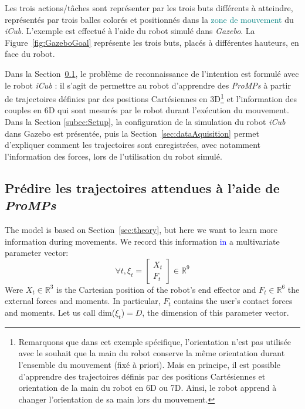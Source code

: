 \documentclass[utf8]{frontiersSCNS} %
\newcommand{\rev}[1]{\textcolor{blue}{#1}}
\newcommand{\toimprove}[1]{\textcolor{teal}{#1}}
\begin{document}
Les trois actions/tâches sont représenter par les trois buts différents à atteindre, représentés par trois balles colorés et positionnés dans la \toimprove{zone de mouvement} du \textit{iCub}. L'exemple est effectué à l'aide du robot simulé dans \textit{Gazebo}. La Figure~\ref{fig:GazeboGoal} représente les trois buts, placés à différentes hauteurs, en face du robot.

Dans la Section~\ref{sec:formulateModelInt}, le problème de reconnaissance de l'intention est formulé avec le robot \textit{iCub} : il s'agit de permettre au robot d'apprendre des \textit{ProMPs} à partir de trajectoires définies par des positions Cartésiennes en 3D\footnote{Remarquons que dans cet exemple spécifique, l'orientation n'est pas utilisée avec le souhait que la main du robot conserve la même orientation durant l'ensemble du mouvement (fixé à priori). Mais en principe, il est possible d'apprendre des trajectoires définis par des positions Cartésiennes et orientation de la main du robot en 6D ou 7D. Ainsi, le robot apprend à changer l'orientation de sa main lors du mouvement.} et l'information des couples en 6D qui sont mesurés par le robot durant l’exécution du mouvement.
Dans la Section \ref{subec:Setup}, la configuration de la simulation du robot \textit{iCub} dans Gazebo est présentée, puis la Section~\ref{sec:dataAquisition} permet d'expliquer comment les trajectoires sont enregistrées, avec notamment l'information des forces, lors de l'utilisation du robot simulé.


\subsection{Prédire les trajectoires attendues à l'aide de \textit{ProMPs}}\label{sec:formulateModelInt}

The model is based on Section~\ref{sec:theory}, but here we want to learn more information during movements. We record this information \rev{in} a multivariate parameter vector:
$$\forall t, \xi_t=\begin{bmatrix} X_t \\ F_t\end{bmatrix} \in \mathbb{R}^{9}$$ 
Were $X_t \in \mathbb{R}^{3}$ is the Cartesian position of the robot's end effector and $F_t \in \mathbb{R}^6$ the external forces and moments. In particular, $F_t$ contains the user's contact forces and moments. Let us call dim($\xi_t$)$ = D$, the dimension of this parameter vector. %
\end{document}
